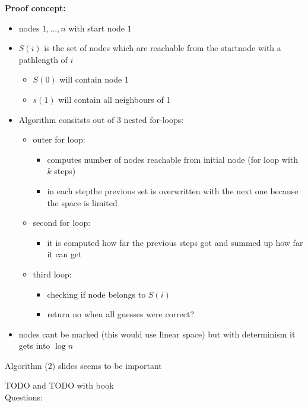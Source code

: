 \documentclass[a4]{scrartcl}
\begin{document}
\textbf{Proof concept:}
\begin{itemize}
\item nodes $1,...,n$ with start node $1$
\item $S(i)$ is the set of nodes which are reachable from the startnode with a pathlength of $i$
\begin{itemize}
\item $S(0)$ will contain node 1
\item $s(1)$ will contain all neighbours of 1
\end{itemize}

\item Algorithm consitsts out of 3 nested for-loops:

\begin{itemize}
\item outer for loop:
\begin{itemize}
\item computes number of nodes reachable from initial node (for loop with $k$ steps)
\item in each stepthe previous set is overwritten with the next one because the space is limited
\end{itemize}

\item second for loop:
\begin{itemize}
\item it is computed how far the previous steps got and summed up how far it can get
\end{itemize}

\item third loop:
\begin{itemize}
\item checking if node belongs to $S(i)$
\item return no when all guesses were correct? 
\end{itemize}
\end{itemize}

\item nodes cant be marked (this would use linear space) but with determinism it gets into $\log n$ 


\end{itemize}

Algorithm (2) slides seems to be important

\color{red} TODO and TODO with book \\
\color{black}
\color{violet} Questions:
\color{black}
\end{document}
